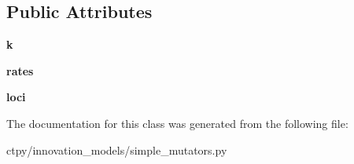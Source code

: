 \subsection*{Public Attributes}
\begin{DoxyCompactItemize}
\item 
\hypertarget{classctpy_1_1innovation__models_1_1simple__mutators_1_1_k_allele_lifetime_tracking_mutator_a520255f4c4c432dec6a359f3fbe43e2c}{{\bfseries k}}\label{classctpy_1_1innovation__models_1_1simple__mutators_1_1_k_allele_lifetime_tracking_mutator_a520255f4c4c432dec6a359f3fbe43e2c}

\item 
\hypertarget{classctpy_1_1innovation__models_1_1simple__mutators_1_1_k_allele_lifetime_tracking_mutator_a0e1450702578e2e363e0b2950cf0eb5b}{{\bfseries rates}}\label{classctpy_1_1innovation__models_1_1simple__mutators_1_1_k_allele_lifetime_tracking_mutator_a0e1450702578e2e363e0b2950cf0eb5b}

\item 
\hypertarget{classctpy_1_1innovation__models_1_1simple__mutators_1_1_k_allele_lifetime_tracking_mutator_acb611732a2906165e25c5b0a324d8683}{{\bfseries loci}}\label{classctpy_1_1innovation__models_1_1simple__mutators_1_1_k_allele_lifetime_tracking_mutator_acb611732a2906165e25c5b0a324d8683}

\end{DoxyCompactItemize}


The documentation for this class was generated from the following file\-:\begin{DoxyCompactItemize}
\item 
ctpy/innovation\-\_\-models/simple\-\_\-mutators.\-py\end{DoxyCompactItemize}
